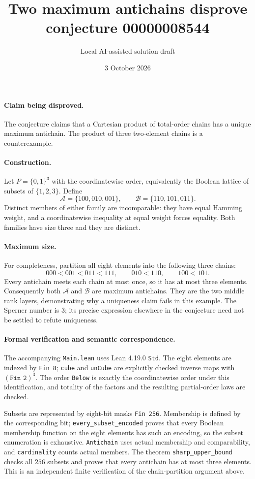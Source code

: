 \documentclass[10pt]{article}
\title{Two maximum antichains disprove conjecture 00000008544}
\author{Local AI-assisted solution draft}
\date{3 October 2026}
\makeatletter
\renewcommand{\maketitle}{\begin{center}
{\Large\bfseries\@title\par}\vspace{0.6em}
{\small\@author\par\@date}
\end{center}\vspace{0.5em}}
\makeatother
\begin{document}
\maketitle
\paragraph{Claim being disproved.}
The conjecture claims that a Cartesian product of total-order chains has a unique maximum antichain. The product of three two-element chains is a counterexample.
\paragraph{Construction.}
Let $P=\{0,1\}^3$ with the coordinatewise order, equivalently the Boolean lattice of subsets of $\{1,2,3\}$. Define
\[
 \mathcal A=\{100,010,001\},\qquad
 \mathcal B=\{110,101,011\}.
\]
Distinct members of either family are incomparable: they have equal Hamming weight, and a coordinatewise inequality at equal weight forces equality. Both families have size three and they are distinct.
\paragraph{Maximum size.}
For completeness, partition all eight elements into the following three chains:
\[
 000<001<011<111,\qquad 010<110,\qquad 100<101.
\]
Every antichain meets each chain at most once, so it has at most three elements. Consequently both $\mathcal A$ and $\mathcal B$ are maximum antichains. They are the two middle rank layers, demonstrating why a uniqueness claim fails in this example. The Sperner number is $3$; its precise expression elsewhere in the conjecture need not be settled to refute uniqueness.
\paragraph{Formal verification and semantic correspondence.}
The accompanying \texttt{Main.lean} uses Lean 4.19.0 \texttt{Std}. The eight elements are indexed by \texttt{Fin 8}; \texttt{cube} and \texttt{unCube} are explicitly checked inverse maps with $(\texttt{Fin 2})^3$. The order \texttt{Below} is exactly the coordinatewise order under this identification, and totality of the factors and the resulting partial-order laws are checked.

Subsets are represented by eight-bit masks \texttt{Fin 256}. Membership is defined by the corresponding bit; \texttt{every\_subset\_encoded} proves that every Boolean membership function on the eight elements has such an encoding, so the subset enumeration is exhaustive. \texttt{Antichain} uses actual membership and comparability, and \texttt{cardinality} counts actual members. The theorem \texttt{sharp\_upper\_bound} checks all $256$ subsets and proves that every antichain has at most three elements. This is an independent finite verification of the chain-partition argument above.
\end{document}
